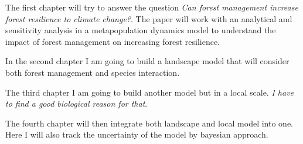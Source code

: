 The first chapter will try to answer the question \textit{Can forest management increase forest resilience to climate change?}. The paper will work with an analytical and sensitivity analysis in a metapopulation dynamics model to understand the impact of forest management on increasing forest resilience.

In the second chapter I am going to build a landscape model that will consider both forest management and species interaction.

The third chapter I am going to build another model but in a local scale. \textit{I have to find a good biological reason for that}.

The fourth chapter will then integrate both landscape and local model into one. Here I will also track the uncertainty of the model by bayesian approach.





